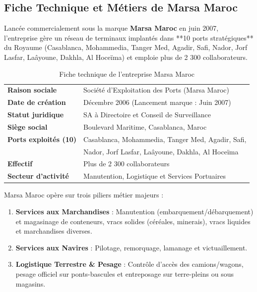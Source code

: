 \documentclass[12pt,a4paper,oneside]{report}
\begin{document}
\subsection{Fiche Technique et Métiers de Marsa Maroc}
Lancée commercialement sous la marque \textbf{Marsa Maroc} en juin 2007, l'entreprise gère un réseau de terminaux implantés dans **10 ports stratégiques** du Royaume (Casablanca, Mohammedia, Tanger Med, Agadir, Safi, Nador, Jorf Lasfar, Laâyoune, Dakhla, Al Hoceïma) et emploie plus de 2 300 collaborateurs.

\begin{table}[H]
\centering
\caption{Fiche technique de l'entreprise Marsa Maroc}
\label{tab:marsa_fiche}
\begin{tabular}{ll}
\toprule
\textbf{Raison sociale} & Société d'Exploitation des Ports (Marsa Maroc) \\
\textbf{Date de création} & Décembre 2006 (Lancement marque : Juin 2007) \\
\textbf{Statut juridique} & SA à Directoire et Conseil de Surveillance \\
\textbf{Siège social} & Boulevard Maritime, Casablanca, Maroc \\
\textbf{Ports exploités (10)} & Casablanca, Mohammedia, Tanger Med, Agadir, Safi, \\
 & Nador, Jorf Lasfar, Laâyoune, Dakhla, Al Hoceïma \\
\textbf{Effectif} & Plus de 2 300 collaborateurs \\
\textbf{Secteur d'activité} & Manutention, Logistique et Services Portuaires \\
\bottomrule
\end{tabular}
\end{table}

Marsa Maroc opère sur trois piliers métier majeurs :
\begin{enumerate}
    \item \textbf{Services aux Marchandises} : Manutention (embarquement/débarquement) et magasinage de conteneurs, vracs solides (céréales, minerais), vracs liquides et marchandises diverses.
    \item \textbf{Services aux Navires} : Pilotage, remorquage, lamanage et victuaillement.
    \item \textbf{Logistique Terrestre \& Pesage} : Contrôle d'accès des camions/wagons, pesage officiel sur ponts-bascules et entreposage sur terre-pleins ou sous magasins.
\end{enumerate}
\end{document}
